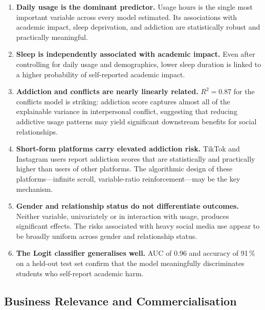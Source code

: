 \documentclass[10pt]{article}
\begin{document}
\begin{enumerate}
  \item \textbf{Daily usage is the dominant predictor.} Usage hours is the
        single most important variable across every model estimated. Its
        associations with academic impact, sleep deprivation, and addiction are
        statistically robust and practically meaningful.

  \item \textbf{Sleep is independently associated with academic impact.} Even
        after controlling for daily usage and demographics, lower sleep
        duration is linked to a higher probability of self-reported academic
        impact.

  \item \textbf{Addiction and conflicts are nearly linearly related.}
        $R^2 = 0.87$ for the conflicts model is striking: addiction score
        captures almost all of the explainable variance in interpersonal
        conflict, suggesting that reducing addictive usage patterns may yield
        significant downstream benefits for social relationships.

  \item \textbf{Short-form platforms carry elevated addiction risk.} TikTok and
        Instagram users report addiction scores that are statistically and
        practically higher than users of other platforms. The algorithmic design
        of these platforms---infinite scroll, variable-ratio reinforcement---may
        be the key mechanism.

  \item \textbf{Gender and relationship status do not differentiate outcomes.}
        Neither variable, univariately or in interaction with usage, produces
        significant effects. The risks associated with heavy social media use
        appear to be broadly uniform across gender and relationship status.

  \item \textbf{The Logit classifier generalises well.} AUC of 0.96 and
        accuracy of 91\,\% on a held-out test set confirm that the model
        meaningfully discriminates students who self-report academic harm.
\end{enumerate}

\subsection{Business Relevance and Commercialisation}
\end{document}
